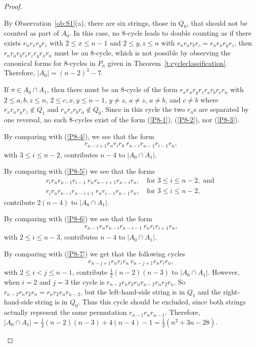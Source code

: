 \documentclass[final]{dmtcs-episciences}
\numberwithin{equation}{section}
\begin{document}
\begin{proof}
\begin{description}
By Observation~\ref{ob:S1}(a), there are six strings, those in $Q_0$, that should not be counted as part of $A_0$. In this case, no 8-cycle leads to double counting as if there exists $r_n r_x r_y r_z $ with $2\leq x\leq n-1$ and $2\leq y,z\leq n$ with $r_nr_ar_br_c=r_nr_xr_yr_z$, then $r_n r_a r_b r_c r_z r_y r_x r_n$ must be an 8-cycle, which is not possible by observing the canonical forms for 8-cycles in $P_n$ given in Theorem~\ref{t:cycleclassification}. Therefore, $|A_0| = (n-2)^3 -7$.

\item[$|A_0 \cap A_1|$.] If $\pi\in A_0\cap A_1$, then there must be an 8-cycle of the form $r_x r_n r_y r_z r_a r_b r_c r_n$ with $2 \leq a,b,z \leq n$, $2 \leq c,x,y \leq n-1$, $y \neq z$, $a \neq z$, $a \neq b$, and $c \neq b$ where $r_x r_n r_y r_z \not\in Q_1$ and $r_n r_c r_b r_a \notin Q_0$. Since in this cycle the two $r_n$s are separated by one reversal, no such 8-cycles exist of the form (\ref{P8-1}), (\ref{P8-2}), nor (\ref{P8-3}). 

By comparing with (\ref{P8-4}), we see that the form
\begin{align*}
&r_{n-i+1} r_n r_i r_k \ r_{n-i} r_{n-1} r_{i-1} r_n, 
\end{align*}
with $ 3 \leq i \leq n-2$, contributes $n-4$ to $|A_0 \cap A_1|$.

By comparing with (\ref{P8-5}) we see that the forms
\begin{align*}
&r_i r_n r_{n-1} r_{i-1} \ r_n r_{n-i+1} r_{n-i} r_n, \quad \text{for } 3 \leq i \leq n-2,\text{ and }\\
&r_{i} r_n r_{n-i} r_{n-i+1} \ r_n r_{i-1} r_{n-1} r_n, \quad \text{for } 3 \leq i \leq n-2,
\end{align*}
contribute $2(n-4)$ to $|A_0 \cap A_1|$.

By comparing with (\ref{P8-6}) we see that the form
\begin{align*}
&r_{n-1} r_n r_{n-i} r_{n-i-1} \ r_n r_i r_{i+1} r_n,
\end{align*}
with $2 \leq i \leq n-3$, contributes $n-4$ to $|A_0 \cap A_1|$.

By comparing with (\ref{P8-7}) we get that the following cycles
\begin{align*}
&r_{n-j+1} r_n r_i r_n \ r_{n-j+1} r_n r_i r_n,
\end{align*}
with $2 \leq i < j\leq n-1$, contribute $\frac{1}{2}(n-2)(n-3)$ to $|A_0 \cap A_1|$. However, when $i=2$ and $j=3$ the cycle is $r_{n-2}r_nr_2r_nr_{n-2}r_nr_2r_n$. So $r_{n-2}r_nr_2r_n=r_nr_2r_nr_{n-2}$, but the left-hand-side string is in $Q_1$ and the right-hand-side string is in $Q_0$. Thus this cycle should be excluded, since both strings actually represent the same permutation $r_{n-1}r_nr_{n-1}$. Therefore, $|A_0 \cap A_1| = \frac{1}{2}(n-2)(n-3) + 4(n-4) -1 = \frac{1}{2}(n^2 + 3n - 28)$.


\end{description}
\end{proof}
\end{document}
